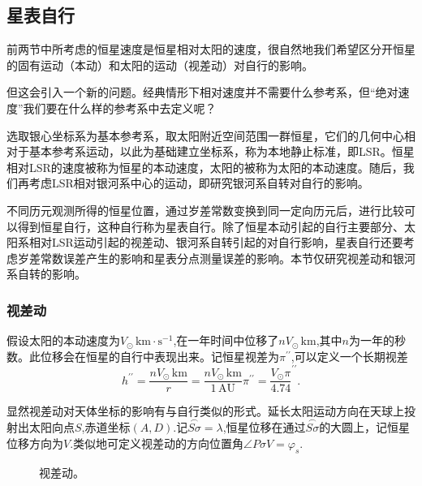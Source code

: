 \documentclass[11pt, a4paper, oneside]{ctexart}
\numberwithin{equation}{subsection}
\begin{document}
\subsection{星表自行}
前两节中所考虑的恒星速度是恒星相对太阳的速度，很自然地我们希望区分开恒星的固有运动（本动）和太阳的运动（视差动）对自行的影响。

但这会引入一个新的问题。经典情形下相对速度并不需要什么参考系，但“绝对速度”我们要在什么样的参考系中去定义呢？

选取银心坐标系为基本参考系，取太阳附近空间范围一群恒星，它们的几何中心相对于基本参考系运动，以此为基础建立坐标系，称为本地静止标准，即LSR。恒星相对LSR的速度被称为恒星的本动速度，太阳的被称为太阳的本动速度。随后，我们再考虑LSR相对银河系中心的运动，即研究银河系自转对自行的影响。

不同历元观测所得的恒星位置，通过岁差常数变换到同一定向历元后，进行比较可以得到恒星自行，这种自行称为星表自行。除了恒星本动引起的自行主要部分、太阳系相对LSR运动引起的视差动、银河系自转引起的对自行影响，星表自行还要考虑岁差常数误差产生的影响和星表分点测量误差的影响。本节仅研究视差动和银河系自转的影响。

\subsubsection{视差动}
假设太阳的本动速度为$V_\odot\,\mathrm{km\cdot{}s^{-1}}$,在一年时间中位移了$nV_\odot\,\mathrm{km}$,其中$n$为一年的秒数。此位移会在恒星的自行中表现出来。记恒星视差为$\pi^{\prime\prime}$,可以定义一个长期视差
\begin{equation}
h^{\prime\prime}=\frac{nV_{\odot}\,\mathrm{km}}{r}=\frac{nV_{\odot}\,\mathrm{km}}{1\,\mathrm{AU}}\pi^{\prime\prime}=\frac{V_{\odot}\pi}{4.74}^{\prime\prime}.
\end{equation}

显然视差动对天体坐标的影响有与自行类似的形式。延长太阳运动方向在天球上投射出太阳向点$S$,赤道坐标$\left(A,D\right)$.记$\overset{\frown}{S\sigma}=\lambda$,恒星位移在通过$\overset{\frown}{S\sigma}$的大圆上，记恒星位移方向为$V$.类似地可定义视差动的方向位置角$\angle{P\sigma V}=\varphi_{s}$.
\begin{figure}[!htp]
\centering
{}
\captionsetup{justification=raggedright, singlelinecheck=false}
\caption{视差动。}
\label{视差动。}
\end{figure}
\end{document}
